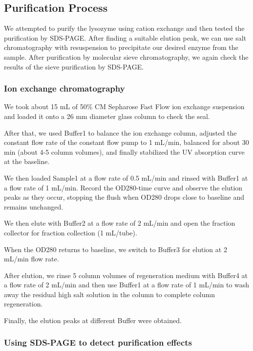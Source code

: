 \hypertarget{purification-process}{%
	\subsection{Purification Process}\label{purification-process}}

We attempted to purify the lysozyme using cation exchange and then
tested the purification by SDS-PAGE. After finding a suitable elution
peak, we can use salt chromatography with resuspension to precipitate
our desired enzyme from the sample. After purification by molecular
sieve chromatography, we again check the results of the sieve
purification by SDS-PAGE.

\subsubsection{Ion exchange chromatography}

We took about 15 mL of 50\% CM Sepharose Fast Flow ion exchange
suspension and loaded it onto a 26 mm diameter glass column to check the
seal.

After that, we used Buffer1 to balance the ion exchange column, adjusted
the constant flow rate of the constant flow pump to 1 mL/min, balanced
for about 30 min (about 4-5 column volumes), and finally stabilized the
UV absorption curve at the baseline.

We then loaded Sample1 at a flow rate of 0.5 mL/min and rinsed with
Buffer1 at a flow rate of 1 mL/min. Record the OD280-time curve and
observe the elution peaks as they occur, stopping the flush when OD280
drops close to baseline and remains unchanged.

We then elute with Buffer2 at a flow rate of 2 mL/min and open the
fraction collector for fraction collection (1 mL/tube).

When the OD280 returns to baseline, we switch to Buffer3 for elution at
2 mL/min flow rate.

After elution, we rinse 5 column volumes of regeneration medium with
Buffer4 at a flow rate of 2 mL/min and then use Buffer1 at a flow rate
of 1 mL/min to wash away the residual high salt solution in the column
to complete column regeneration.

Finally, the elution peaks at different Buffer were obtained.

\subsubsection{Using SDS-PAGE to detect purification effects}

